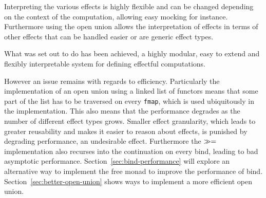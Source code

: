 Interpreting the various effects is highly flexible and can be changed depending
on the context of the computation, allowing easy mocking for instance.
Furthermore using the open union allows the interpretation of effects in terms
of other effects that can be handled easier or are generic effect types.

What was set out to do has been achieved, a highly modular, easy to extend and
flexibly interpretable system for defining effectful computations.

However an issue remains with regards to efficiency. Particularly the
implementation of an open union using a linked list of functors means that some
part of the list has to be traversed on every \texttt{fmap}, which is used
ubiquitously in the implementation. This also means that the performance
degrades as the number of different effect types grows. Smaller effect
granularity, which leads to greater reusability and makes it easier to reason
about effects, is punished by degrading performance, an undesirable effect.
Furthermore the $\gg={}$ implementation also recurses into the continuation
on every bind, leading to bad asymptotic performance.
Section~\ref{sec:bind-performance} will explore an alternative way to implement
the free monad to improve the performance of bind.
Section~\ref{sec:better-open-union} shows ways to implement a more efficient
open union.
